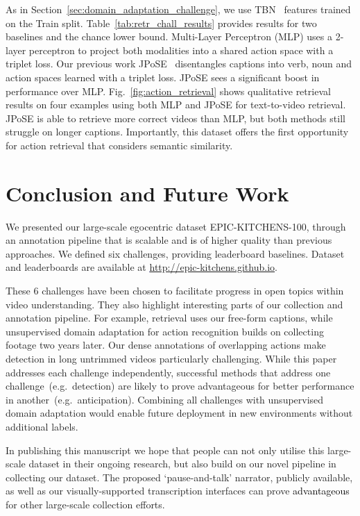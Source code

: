 \documentclass[twocolumn]{svjour3}          \smartqed
\makeatletter
\newcommand{\chParagraph}[1]{\noindent {\textbf{#1.}} \hspace{6pt}}
\newcommand{\edits}[1]{\textcolor{black}{#1}}
\newcommand {\newDataset} {EPIC-KITCHENS-100}
\newcommand{\annStyle} {`pause-and-talk'{}}
\newcommand*{\eg}{e.g.\@\xspace}
\makeatother
\begin{document}
\chParagraph{Baselines and Results}
As in Section~\ref{sec:domain_adaptation_challenge}, we use TBN~\cite{kazakos2019epic} features trained on the Train split.
Table~\ref{tab:retr_chall_results} provides results for two baselines and the chance lower bound.
Multi-Layer Perceptron (MLP) uses a 2-layer perceptron to project both modalities into a shared action space with a triplet loss. Our previous work JPoSE~\cite{wray2019fine} disentangles captions into verb, noun and action spaces learned with a triplet loss.
JPoSE sees a significant boost in performance over MLP.
Fig.~\ref{fig:action_retrieval} shows qualitative retrieval results on four examples using both MLP and JPoSE for text-to-video retrieval. JPoSE is able to retrieve more correct videos than MLP, but both methods still struggle on longer captions.
Importantly, this dataset offers the first opportunity for  action retrieval that considers semantic similarity.


\section{Conclusion and Future Work}
We presented our large-scale egocentric dataset \newDataset{}, through an annotation pipeline that is scalable and \edits{is} of higher quality than previous approaches. We defined six challenges, providing leaderboard baselines. Dataset and leaderboards are available at \textcolor{blue}{\underline{\url{http://epic-kitchens.github.io}}}.

These 6 challenges have been chosen to facilitate progress in open topics within video understanding. They also highlight interesting parts of our collection and annotation pipeline. For example, retrieval uses our free-form captions, while unsupervised domain adaptation for action recognition builds on collecting footage two years later. Our dense annotations of overlapping actions make detection in long untrimmed videos particularly challenging. While this paper addresses each challenge independently, successful methods that address one challenge~(\eg~detection) are likely to prove advantageous for better performance in another~(\eg~anticipation). Combining all challenges with unsupervised domain adaptation would enable future deployment in new environments without additional labels.

In publishing this manuscript we hope that people can not only utilise this large-scale dataset in their ongoing research, but also build on our novel pipeline in collecting our dataset. The proposed \annStyle{} narrator, publicly available, as well as our visually-supported transcription interfaces can prove \edits{advantageous} for other large-scale collection efforts.
\end{document}
